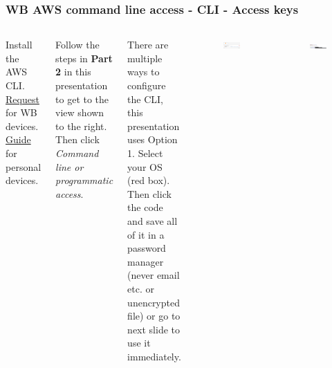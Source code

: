 \documentclass[aspectratio=169]{beamer} %
\begin{document}
\begin{frame}
	\frametitle{WB AWS command line access - CLI - Access keys}
	\begin{columns}[c]

		Install the AWS CLI.
		\href{https://worldbankgroup.service-now.com/wbg?id=wbg_sc_catalog&sys_id=bd1e71b86f16d340db112d232e3ee4b7}{Request}
		for WB devices.
		\href{https://docs.aws.amazon.com/cli/latest/userguide/getting-started-install.html}{Guide} 
		for personal devices.

		\vspace{.5cm}

		Follow the steps in \textbf{Part 2} in this presentation
		to get to the view shown to the right.	
		Then click \textit{Command line or programmatic access}.
		
		\vspace{.5cm} 
		
		There are multiple ways to configure the CLI, 
		this presentation uses Option 1. 
		Select your OS (red box).
		Then click the code and save all of it in a password manager 
		(never email etc. or unencrypted file) 
		or go to next slide to use it immediately.
		
		\begin{figure}
			\centering
			\includegraphics[width=1\textwidth]{./img/logon-2.png}
		\end{figure}
		\begin{figure}
			\centering
			\includegraphics[width=1\textwidth]{./img/aws-cli-get-keys.png}
		\end{figure}
		
	\end{columns}
\end{frame}
\end{document}
